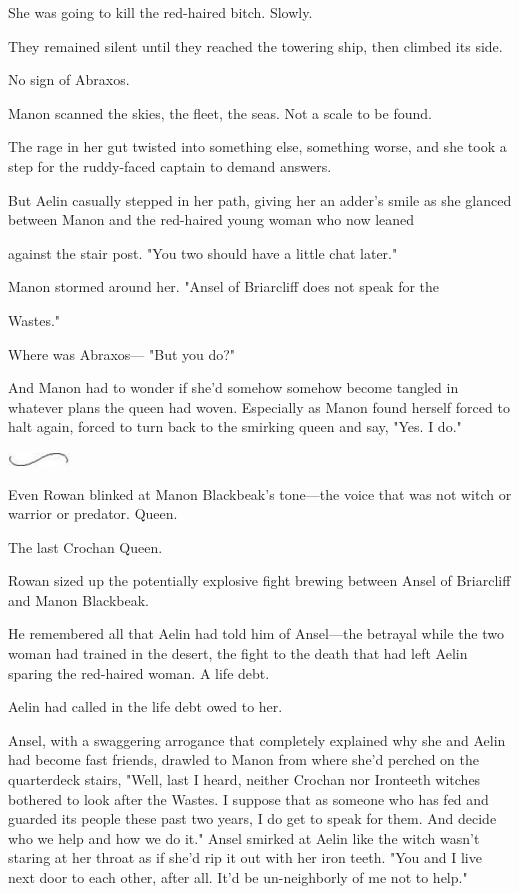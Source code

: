 She was going to kill the red-haired bitch. Slowly.

They remained silent until they reached the towering ship, then climbed its side.

No sign of Abraxos.

Manon scanned the skies, the fleet, the seas. Not a scale to be found.

The rage in her gut twisted into something else, something worse, and she took a step for the ruddy-faced captain to demand answers.

But Aelin casually stepped in her path, giving her an adder's smile as she glanced between Manon and the red-haired young woman who now leaned

against the stair post. "You two should have a little chat later."

Manon stormed around her. "Ansel of Briarcliff does not speak for the

Wastes."

Where was Abraxos--- "But you do?"

And Manon had to wonder if she'd somehow  somehow become tangled in whatever plans the queen had woven. Especially as Manon found herself forced to halt again, forced to turn back to the smirking queen and say, "Yes. I do."

\includegraphics[width=0.65in,height=0.13in]{images/seperator}

Even Rowan blinked at Manon Blackbeak's tone---the voice that was not witch or warrior or predator. Queen.

The last Crochan Queen.

Rowan sized up the potentially explosive fight brewing between Ansel of Briarcliff and Manon Blackbeak.

He remembered all that Aelin had told him of Ansel---the betrayal while the two woman had trained in the desert, the fight to the death that had left Aelin sparing the red-haired woman. A life debt.

Aelin had called in the life debt owed to her.

Ansel, with a swaggering arrogance that completely explained why she and Aelin had become fast friends, drawled to Manon from where she'd perched on the quarterdeck stairs, "Well, last I heard, neither Crochan nor Ironteeth witches bothered to look after the Wastes. I suppose that as someone who has fed and guarded its people these past two years, I do get to speak for them. And decide who we help and how we do it." Ansel smirked at Aelin like the witch wasn't staring at her throat as if she'd rip it out with her iron teeth. "You and I live next door to each other, after all. It'd be un-neighborly of me not to help."

